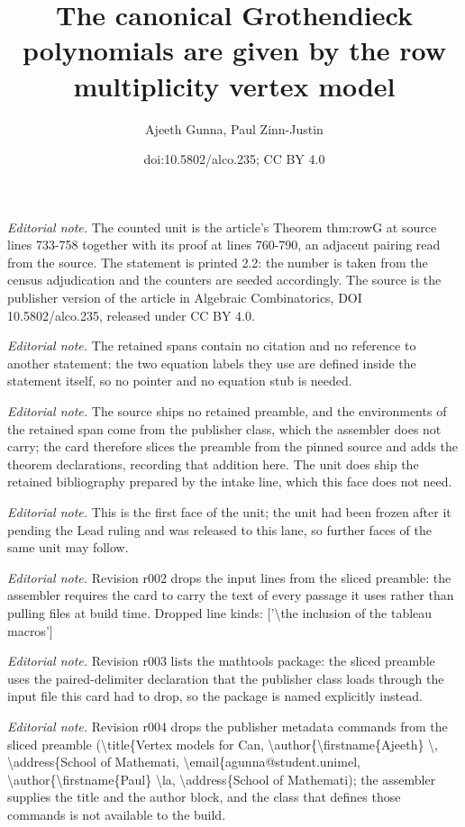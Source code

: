 \documentclass[11pt]{article}
\title{The canonical Grothendieck polynomials are given by the row multiplicity vertex model}
\author{Ajeeth Gunna, Paul Zinn-Justin}
\date{doi:10.5802/alco.235; CC BY 4.0}
\begin{document}
\maketitle
\setcounter{section}{2}
\setcounter{theo}{1}
\noindent\textit{Editorial note.} The counted unit is the article's Theorem thm:rowG at source lines 733-758 together with its proof at lines 760-790, an adjacent pairing read from the source. The statement is printed 2.2: the number is taken from the census adjudication and the counters are seeded accordingly. The source is the publisher version of the article in Algebraic Combinatorics, DOI 10.5802/alco.235, released under CC BY 4.0.\par\medskip
\noindent\textit{Editorial note.} The retained spans contain no citation and no reference to another statement: the two equation labels they use are defined inside the statement itself, so no pointer and no equation stub is needed.\par\medskip
\noindent\textit{Editorial note.} The source ships no retained preamble, and the environments of the retained span come from the publisher class, which the assembler does not carry; the card therefore slices the preamble from the pinned source and adds the theorem declarations, recording that addition here. The unit does ship the retained bibliography prepared by the intake line, which this face does not need.\par\medskip
\noindent\textit{Editorial note.} This is the first face of the unit; the unit had been frozen after it pending the Lead ruling and was released to this lane, so further faces of the same unit may follow.\par\medskip
\noindent\textit{Editorial note.} Revision r002 drops the input lines from the sliced preamble: the assembler requires the card to carry the text of every passage it uses rather than pulling files at build time. Dropped line kinds: ['\textbackslash{}the inclusion of the tableau macros']\par\medskip
\noindent\textit{Editorial note.} Revision r003 lists the mathtools package: the sliced preamble uses the paired-delimiter declaration that the publisher class loads through the input file this card had to drop, so the package is named explicitly instead.\par\medskip
\noindent\textit{Editorial note.} Revision r004 drops the publisher metadata commands from the sliced preamble (\textbackslash{}title\{Vertex models for Can, \textbackslash{}author\{\textbackslash{}firstname\{Ajeeth\} \textbackslash{}, \textbackslash{}address\{School of Mathemati, \textbackslash{}email\{agunna@student.unimel, \textbackslash{}author\{\textbackslash{}firstname\{Paul\} \textbackslash{}la, \textbackslash{}address\{School of Mathemati); the assembler supplies the title and the author block, and the class that defines those commands is not available to the build.\par\medskip
\end{document}
